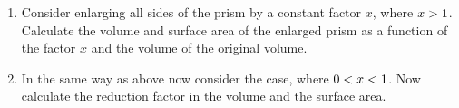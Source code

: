{\begin{mdframed}[linewidth=4, leftmargin=40, rightmargin=40]
\begin{exercise}
    \addtocounter{footnote}{-0}
    
        \par 
        \label{m39357*id63651}\begin{enumerate}[noitemsep, label=\textbf{\arabic*}. ] 
            \leftskip=20pt\rightskip=\leftskip\label{m39357*uid21}\item Consider enlarging all sides of the prism by a constant factor $x$, where \begin{math}x>{}1\end{math}. Calculate the volume and surface area of the enlarged prism as a function of the factor \begin{math}x\end{math} and the volume of the original volume.
\label{m39357*uid22}\item In the same way as above now consider the case, where $0<{}x<{}1$. Now calculate the reduction factor in the volume and the surface area.
\end{enumerate}
        

\end{exercise}
\end{mdframed}}
